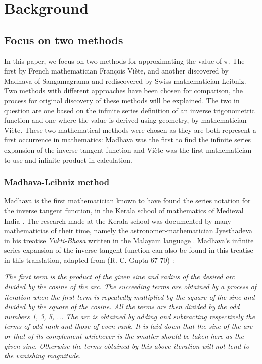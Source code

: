 \section{Background}

\subsection{Focus on two methods}

In this paper, we focus on two methods for approximating the value of $\pi$. 
The first by French mathematician François Viète, and another discovered by Madhava of Sangamagrama and 
rediscovered by Swiss mathematician Leibniz. Two methods with different approaches have been chosen for 
comparison, the process for original discovery of these methods
will be explained. The two in question are one based on 
the infinite series definition of an inverse trigonometric function 
and one where the value is derived using geometry, by mathematician 
Viète. These two mathematical methods were chosen as they are both 
represent a first occurrence in mathematics: Madhava was the first to 
find the infinite series expansion of the inverse tangent function and Viète was 
the first mathematician to use and infinite product in calculation. 


\subsubsection{Madhava-Leibniz method}

Madhava is the first mathematician known to have found the series notation for 
the inverse tangent function, in the Kerala school of mathematics of Medieval India 
\cite{amermathmonthly}. The research made at the Kerala school was documented by 
many mathematicias of their time, namely the astronomer-mathematician Jyesthadeva 
in his treatise \textit{Yukti-Bhasa} written in the Malayam language \cite{oconnor_robertson_2000}. 
Madhava's infinite series expansion of the inverse tangent function can also be 
found in this treatise in this translation, adapted from (R. C. Gupta 67-70) 
\cite{rc_gupta_mgseries}: 

\textit{The first term is the product of the given sine and radius of the desired arc divided 
by the cosine of the arc. The succeeding terms are obtained by a process of 
iteration when the first term is repeatedly multiplied by the square of the 
sine and divided by the square of the cosine. All the terms are then divided by 
the odd numbers 1, 3, 5, ... The arc is obtained by adding and subtracting 
respectively the terms of odd rank and those of even rank. It is laid down that 
the sine of the arc or that of its complement whichever is the smaller should be 
taken here as the given sine. Otherwise the terms obtained by this above iteration 
will not tend to the vanishing magnitude.}


